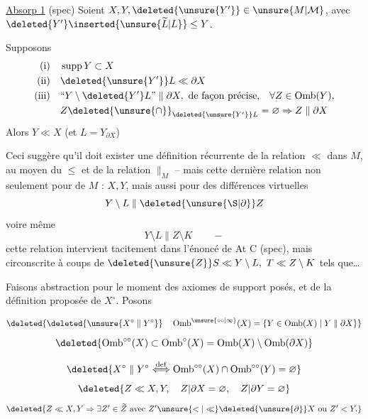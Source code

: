 \uline{Absorp 1} (spec) Soient $X,Y,\deleted{\unsure{Y'}}\in\unsure{M|\mathcal M}$, avec $\deleted{Y'}\inserted{\unsure{\widetilde L|L}}\leq Y$.

Supposons
\[
\begin{aligned}
\text{(i)}\quad &\operatorname{supp}Y\subset X\\
\text{(ii)}\quad &\deleted{\unsure{Y'}}L\ll\partial X\\
\text{(iii)}\quad &\text{``}Y\setminus\deleted{Y'}L\text{''}\parallel\partial X,\ \text{de façon précise,}\quad\forall Z\in\operatorname{Omb}(Y),\\
&Z\deleted{\unsure{\cap}}_{\deleted{\unsure{Y'}}L}=\varnothing\Rightarrow Z\parallel\partial X
\end{aligned}
\]
Alors $Y\ll X$ (et $L=Y_{\partial X}$)

Ceci suggère qu'il doit exister une définition récurrente de la relation $\ll$ dans $M$, au moyen du $\leq$ et de la relation $\parallel_M$ -- mais cette dernière relation non seulement pour  de $M$ : $X,Y$, mais aussi pour des différences virtuelles
\[
Y\setminus L\parallel\deleted{\unsure{\S|\partial}}Z
\]
voire même
\[
Y\setminus L\parallel Z\setminus K\qquad -
\]
cette relation intervient tacitement dans l'énoncé de At C (spec), mais circonscrite à coups de $\deleted{\unsure{Z}}S\ll Y\setminus L,\ T\ll Z\setminus K$ tels que\ldots
{}

Faisons abstraction pour le moment des axiomes de support posés, et de la définition proposée de $X^\circ$. Posons

\[
\deleted{\deleted{\unsure{X^\circ\parallel Y^\circ}}\quad\operatorname{Omb}^{\unsure{\circ\circ|\infty}}(X)=\{Y\in\operatorname{Omb}(X)\mid Y\parallel\partial X\}}
\]
\[
\deleted{\operatorname{Omb}^{\circ\circ}(X)\subset\operatorname{Omb}^{\circ}(X)=\operatorname{Omb}(X)\setminus\operatorname{Omb}(\partial X)}
\]

\[
\deleted{X^\circ\parallel Y^\circ\overset{\mathrm{def}}{\Longleftrightarrow}\operatorname{Omb}^{\circ\circ}(X)\cap\operatorname{Omb}^{\circ\circ}(Y)=\varnothing}
\]
\[
\deleted{Z\ll X,Y,\quad Z|\partial X=\varnothing,\quad Z|\partial Y=\varnothing}
\]
\[
\deleted{Z\ll X,Y\Rightarrow\exists Z'\in\widetilde Z\ \text{avec}\ Z'\unsure{<|\ll}\deleted{\unsure{\partial}}X\ \text{ou}\ Z'<Y.}
\]

